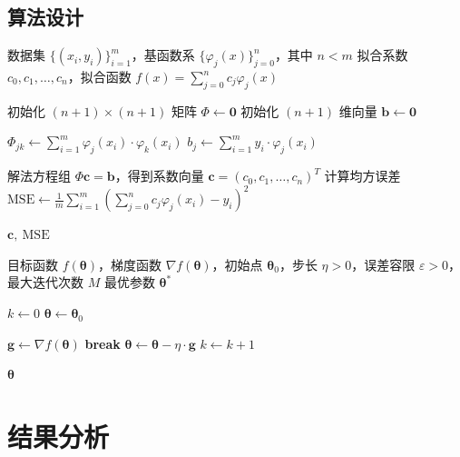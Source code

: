 \documentclass{article}
\begin{document}
\subsection{算法设计}
\begin{algorithm}[H]
\caption{广义多项式拟合}
\begin{algorithmic}[1]
\REQUIRE 数据集 $\{(x_i, y_i)\}_{i=1}^{m}$，基函数系 $\{\varphi_j(x)\}_{j=0}^{n}$，其中 $n < m$
\ENSURE 拟合系数 $c_0, c_1, \dots, c_n$，拟合函数 $f(x) = \sum_{j=0}^{n} c_j \varphi_j(x)$

\STATE 初始化 $(n+1) \times (n+1)$ 矩阵 $\Phi \gets \mathbf{0}$
\STATE 初始化 $(n+1)$ 维向量 $\mathbf{b} \gets \mathbf{0}$

        \STATE $\Phi_{jk} \gets \sum_{i=1}^{m} \varphi_j(x_i) \cdot \varphi_k(x_i)$
    \ENDFOR
    \STATE $b_j \gets \sum_{i=1}^{m} y_i \cdot \varphi_j(x_i)$
\ENDFOR

\STATE 解法方程组 $\Phi \mathbf{c} = \mathbf{b}$，得到系数向量 $\mathbf{c} = (c_0, c_1, \dots, c_n)^T$
\STATE 计算均方误差 $\mathrm{MSE} \gets \frac{1}{m} \sum_{i=1}^{m} \left( \sum_{j=0}^{n} c_j \varphi_j(x_i) - y_i \right)^2$

\STATE \RETURN $\mathbf{c},\ \mathrm{MSE}$
\end{algorithmic}
\end{algorithm}
\begin{algorithm}[H]
\caption{梯度下降法 (Gradient Descent)}
\begin{algorithmic}[1]
\REQUIRE 目标函数 $f(\boldsymbol{\theta})$，梯度函数 $\nabla f(\boldsymbol{\theta})$，初始点 $\boldsymbol{\theta}_0$，步长 $\eta > 0$，误差容限 $\varepsilon > 0$，最大迭代次数 $M$
\ENSURE 最优参数 $\boldsymbol{\theta}^{*}$

\STATE $k \gets 0$
\STATE $\boldsymbol{\theta} \gets \boldsymbol{\theta}_0$

    \STATE $\mathbf{g} \gets \nabla f(\boldsymbol{\theta})$ 
        \STATE \textbf{break} 
    \ENDIF
    \STATE $\boldsymbol{\theta} \gets \boldsymbol{\theta} - \eta \cdot \mathbf{g}$ 
    \STATE $k \gets k + 1$
\ENDWHILE

\STATE \RETURN $\boldsymbol{\theta}$
\end{algorithmic}
\end{algorithm}

\section{结果分析}
\end{document}
